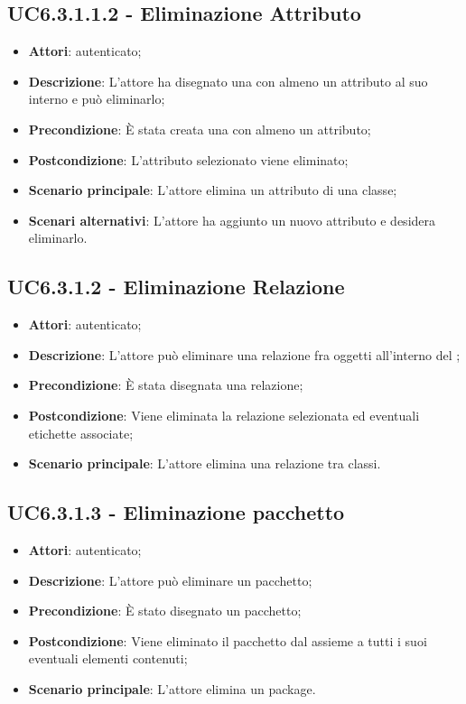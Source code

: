 \subsection{UC6.3.1.1.2 - Eliminazione Attributo}
\label{ssec:UC6.3.1.1.2}
\begin{itemize}
\item \textbf{Attori}:  autenticato;
\item \textbf{Descrizione}: L'attore ha disegnato una  con almeno un attributo al suo interno e può eliminarlo;
\item \textbf{Precondizione}: È stata creata una  con almeno un attributo;
\item \textbf{Postcondizione}: L'attributo selezionato viene eliminato;
\item \textbf{Scenario principale}: L'attore elimina un attributo di una classe;
\item \textbf{Scenari alternativi}: L'attore ha aggiunto un nuovo attributo e desidera eliminarlo.
\end{itemize}
\subsection{UC6.3.1.2 - Eliminazione Relazione}
\label{ssec:UC6.3.1.2}
\begin{itemize}
\item \textbf{Attori}:  autenticato;
\item \textbf{Descrizione}: L'attore può eliminare una relazione fra oggetti all'interno del ;
\item \textbf{Precondizione}: È stata disegnata una relazione;
\item \textbf{Postcondizione}: Viene eliminata la relazione selezionata ed eventuali etichette associate;
\item \textbf{Scenario principale}: L'attore elimina una relazione tra classi.
\end{itemize}
\subsection{UC6.3.1.3 - Eliminazione pacchetto}
\label{ssec:UC6.3.1.3}
\begin{itemize}
\item \textbf{Attori}:  autenticato;
\item \textbf{Descrizione}: L'attore può eliminare un pacchetto;
\item \textbf{Precondizione}: È stato disegnato un pacchetto;
\item \textbf{Postcondizione}: Viene eliminato il pacchetto dal  assieme a tutti i suoi eventuali elementi contenuti;
\item \textbf{Scenario principale}: L'attore elimina un package.
\end{itemize}
